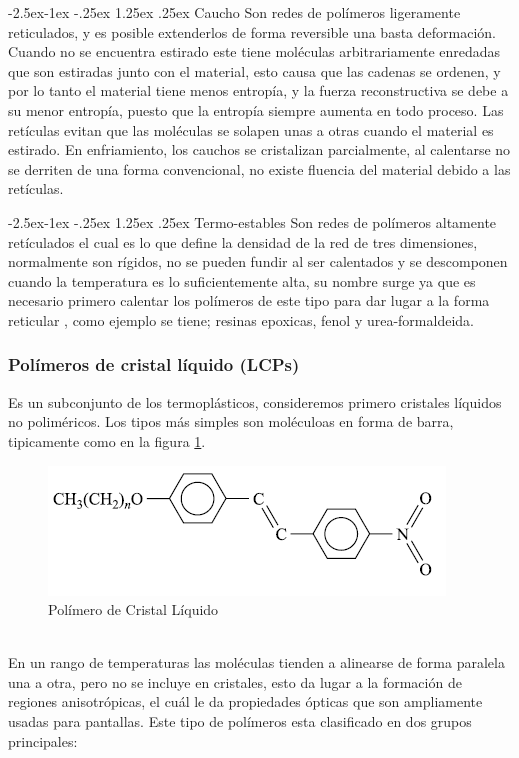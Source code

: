 \documentclass[a4paper, 11pt]{article}
\makeatletter
\renewcommand\paragraph{\@startsection{paragraph}{4}{\z@}%
            {-2.5ex\@plus -1ex \@minus -.25ex}%
            {1.25ex \@plus .25ex}%
            {\normalfont\normalsize\bfseries}}
\makeatother
\begin{document}
\paragraph{Caucho} Son redes de polímeros ligeramente reticulados,  y es posible extenderlos de forma reversible una basta deformación. Cuando no se encuentra estirado este tiene moléculas arbitrariamente enredadas que son estiradas junto con el material, esto causa que las cadenas se ordenen, y por lo tanto el material tiene menos entropía, y la fuerza reconstructiva se debe a su menor entropía, puesto que la entropía siempre aumenta en todo proceso. Las retículas evitan que las moléculas se solapen unas a otras cuando el material es estirado. En enfriamiento, los cauchos se cristalizan parcialmente, al calentarse no se derriten de una forma convencional, no existe fluencia del material debido a las retículas.

\paragraph{Termo-estables} Son redes de polímeros altamente retículados el cual es lo que define la densidad de la red de tres dimensiones, normalmente son rígidos, no se pueden fundir al ser calentados y se descomponen cuando la temperatura es lo suficientemente alta, su nombre surge ya que es necesario primero calentar los polímeros de este tipo para dar lugar a la forma reticular , como ejemplo se tiene; resinas epoxicas, fenol y urea-formaldeida.

\subsubsection{Polímeros de cristal líquido (LCPs)} 
Es un subconjunto de los termoplásticos, consideremos primero cristales líquidos no poliméricos. Los tipos más simples son moléculoas en forma de barra, tipicamente como en la figura \ref{lcp}.

\begin{figure}[h!] 
\centering
    \includegraphics[scale=0.9]{lcp.png}
     \caption{Polímero de Cristal Líquido}
    \label{lcp}
\end{figure}
\
\\
En un rango de temperaturas las moléculas tienden a alinearse de forma paralela una a otra, pero no se incluye en cristales, esto da lugar a la formación de regiones anisotrópicas, el cuál le da propiedades ópticas que son ampliamente usadas para pantallas. 
Este tipo de polímeros esta clasificado en dos grupos principales:
\end{document}
